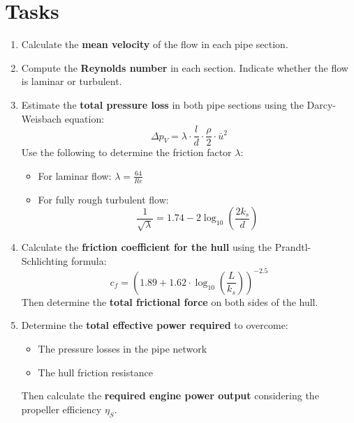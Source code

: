 \documentclass[12pt,a4paper]{article}
\begin{document}
\section*{Tasks}
\begin{enumerate}[label=\alph*)]
    \item Calculate the \textbf{mean velocity} of the flow in each pipe section.\\

    \item Compute the \textbf{Reynolds number} in each section. Indicate whether the flow is laminar or turbulent.\\

    \item Estimate the \textbf{total pressure loss} in both pipe sections using the Darcy-Weisbach equation:
    \[
    \Delta p_V = \lambda \cdot \frac{l}{d} \cdot \frac{\rho}{2} \cdot \bar{u}^2
    \]
    Use the following to determine the friction factor $\lambda$:
    \begin{itemize}
        \item For laminar flow: $\lambda = \frac{64}{Re}$
        \item For fully rough turbulent flow:
        \[
        \frac{1}{\sqrt{\lambda}} = 1.74 - 2 \log_{10}\left( \frac{2k_s}{d} \right)
        \]
    \end{itemize}

    \item Calculate the \textbf{friction coefficient for the hull} using the Prandtl-Schlichting formula:
    \[
    c_f = \left(1.89 + 1.62 \cdot \log_{10}\left(\frac{L}{k_s}\right)\right)^{-2.5}
    \]
    Then determine the \textbf{total frictional force} on both sides of the hull.\\

    \item Determine the \textbf{total effective power required} to overcome:
    \begin{itemize}
        \item The pressure losses in the pipe network
        \item The hull friction resistance
    \end{itemize}
    Then calculate the \textbf{required engine power output} considering the propeller efficiency $\eta_S$.\\
\end{enumerate}
\end{document}
